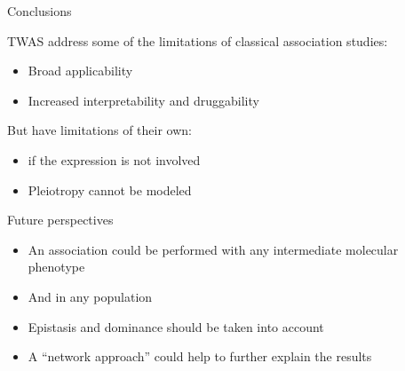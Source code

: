 \documentclass[aspectratio=169,12pt]{beamer}
\begin{document}
\begin{frame}{Conclusions}

	TWAS address some of the limitations of classical association 
studies:

	\begin{itemize}
		\item Broad applicability
		\item Increased interpretability and druggability
	\end{itemize}

	But have limitations of their own:

	\begin{itemize}
		\item if the expression is not involved
		\item Pleiotropy cannot be modeled
	\end{itemize}

\end{frame}

\begin{frame}{Future perspectives}

	\begin{itemize}
		\item<1-> An association could be performed with any 
intermediate molecular phenotype
		\item<2-> And in any population
		\item<3-> Epistasis and dominance should be taken into account
		\item<4-> A \enquote{network approach} could help to further 
explain the results
	\end{itemize}


\end{frame}

\appendix

\begin{frame}[plain]
	\nocite{*}
	\tiny
	\printbibliography[title=References,keyword=TWAS]
\end{frame}
\end{document}
